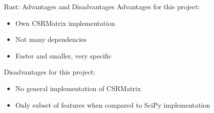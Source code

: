 \begin{frame}[c]{Rust: Advantages and Disadvantages}
    Advantages for this project:
    \begin{itemize}[<+(1)->]
        \item Own CSRMatrix implementation
        \item Not many dependencies
        \item Faster and smaller, very specific
    \end{itemize}
    \pause
    Disadvantages for this project:
    \begin{itemize}[<+(1)->]
        \item No general implementation of CSRMatrix
        \item Only subset of features when compared to SciPy implementation
    \end{itemize}
\end{frame}


